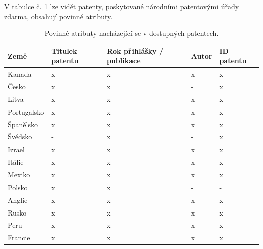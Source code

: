 \noindent V tabulce č. \ref{tab:table_attributes_critical} lze vidět patenty, poskytované národními patentovými úřady zdarma, obsahují povinné atributy.
	\begin{table}[H]
	\centering
	\begin{tabular}{|>{\centering\arraybackslash}p{2.2cm}|>{\centering\arraybackslash}p{2cm}|>{\centering\arraybackslash}p{3cm}|>{\centering\arraybackslash}p{2cm}|>{\centering\arraybackslash}p{2.5cm}|} 
	\hline
	\textbf{Země}    & \textbf{Titulek patentu} & \textbf{Rok přihlášky / publikace} & \textbf{Autor} & \textbf{ID patentu}                \\ 
	\hline
	Kanada & x & x & x & x \\
	\hline
	Česko & x & x & - & x \\
	\hline
	Litva & x & x & x & x \\
	\hline
	Portugalsko & x & x & x & x \\
	\hline
	Španělsko & x & x & x & x \\
	\hline
	Švédsko & - & x & - & x \\
	\hline
	Izrael & x & x & x & x \\
	\hline
	Itálie & x & x & x & x \\
	\hline
	Mexiko & x & x & x & x \\
	\hline
	Polsko & x & x & - & - \\
	\hline
	Anglie & x & x & x & x \\
	\hline
	Rusko & x & x & x & x \\
	\hline
	Peru & x & x & x & x \\
	\hline
	Francie & x & x & x & x \\
	\hline
	\end{tabular}
	\caption{Povinné atributy nacházející se v dostupných patentech.}
	\label{tab:table_attributes_critical}
	\end{table}

